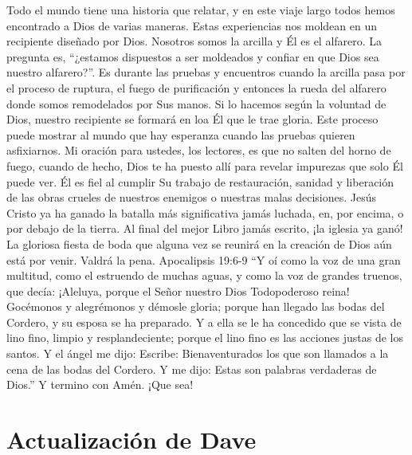\documentclass[twoside, 12pt]{book}
\begin{document}
Todo el mundo tiene una historia que relatar, y en este viaje largo todos hemos encontrado a Dios de varias maneras.  Estas experiencias nos moldean en un recipiente diseñado por Dios.  Nosotros somos la arcilla y Él es el alfarero.  La pregunta es, “¿estamos dispuestos a ser moldeados y confiar en que Dios sea nuestro alfarero?”.  Es durante las pruebas y encuentros cuando la arcilla pasa por el proceso de ruptura, el fuego de purificación y entonces la rueda del alfarero donde somos remodelados por Sus manos.  Si lo hacemos según la voluntad de Dios, nuestro recipiente se formará en loa Él que le trae gloria.  Este proceso puede mostrar al mundo que hay esperanza cuando las pruebas quieren asfixiarnos.  Mi oración para ustedes, los lectores, es que no salten del horno de fuego, cuando de hecho, Dios te ha puesto allí para revelar impurezas que solo Él puede ver.  Él es fiel al cumplir Su trabajo de restauración, sanidad y liberación de las obras crueles de nuestros enemigos o nuestras malas decisiones. Jesús Cristo ya ha ganado la batalla más significativa jamás luchada, en, por encima, o por debajo de la tierra. Al final del mejor Libro jamás escrito, ¡la iglesia ya ganó!  La gloriosa fiesta de boda que alguna vez se reunirá en la creación de Dios aún está por venir. Valdrá la pena.
Apocalipsis 19:6-9 “Y oí como la voz de una gran multitud, como el estruendo de muchas aguas, y como la voz de grandes truenos, que decía: ¡Aleluya, porque el Señor nuestro Dios Todopoderoso reina! Gocémonos y alegrémonos y démosle gloria; porque han llegado las bodas del Cordero, y su esposa se ha preparado. Y a ella se le ha concedido que se vista de lino fino, limpio y resplandeciente; porque el lino fino es las acciones justas de los santos. Y el ángel me dijo: Escribe: Bienaventurados los que son llamados a la cena de las bodas del Cordero. Y me dijo: Estas son palabras verdaderas de Dios.”
Y termino con Amén. ¡Que sea!


\clearpage
\section{Actualización de Dave}
\
\end{document}
